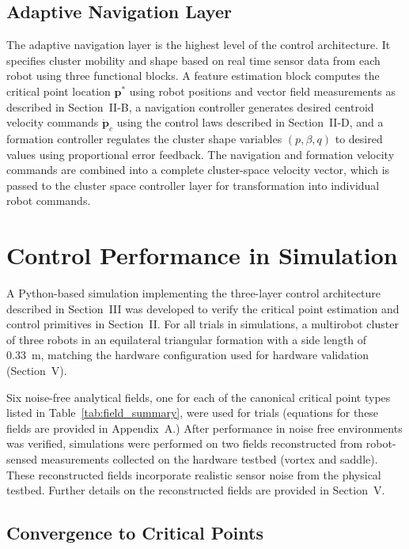 \documentclass[lettersize,journal]{IEEEtran}
\begin{document}
\subsection{Adaptive Navigation Layer}

The adaptive navigation layer is the highest level of the control architecture. It specifies cluster mobility and shape based on real time sensor data from each robot using three functional blocks. A feature estimation block computes the critical point location $\mathbf{p}^*$ using robot positions and vector field measurements as described in Section~II-B, a navigation controller generates desired centroid velocity commands $\dot{\mathbf{p}}_c$ using the control laws described in Section~II-D, and a formation controller regulates the cluster shape variables $(p, \beta, q)$ to desired values using proportional error feedback. The navigation and formation velocity commands are combined into a complete cluster-space velocity vector, which is passed to the cluster space controller layer for transformation into individual robot commands.


\section{Control Performance in Simulation}

A Python-based simulation implementing the three-layer control architecture described in Section~III was developed to verify the critical point estimation and control primitives in Section~II. For all trials in simulations, a multirobot cluster of three robots in an equilateral triangular formation with a side length of 0.33~m, matching the hardware configuration used for hardware validation (Section~V).

Six noise-free analytical fields, one for each of the canonical critical point types listed in Table~\ref{tab:field_summary}, were used for trials (equations for these fields are provided in Appendix~A.) After performance in noise free environments was verified, simulations were performed on two fields reconstructed from robot-sensed measurements collected on the hardware testbed (vortex and saddle). These reconstructed fields incorporate realistic sensor noise from the physical testbed. Further details on the reconstructed fields are provided in Section~V.

\subsection{Convergence to Critical Points}
\end{document}
